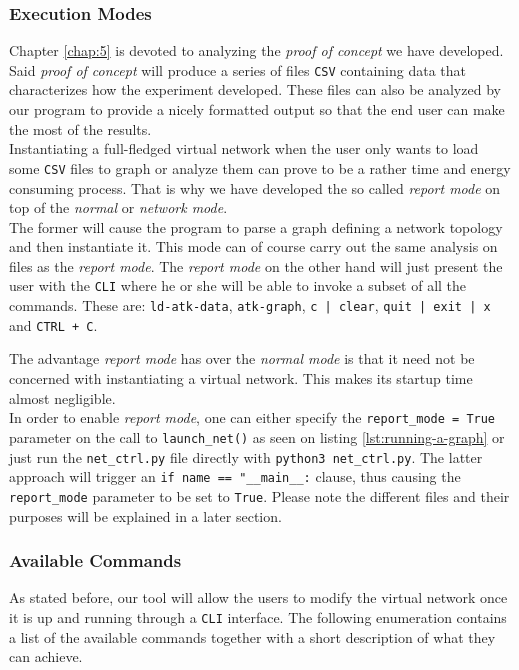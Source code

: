             \subsubsection{Execution Modes}
                Chapter \ref{chap:5} is devoted to analyzing the \textit{proof of concept} we have developed. Said \textit{proof of concept} will produce a series of files \texttt{CSV} containing data that characterizes how the experiment developed. These files can also be analyzed by our program to provide a nicely formatted output so that the end user can make the most of the results.\\

                Instantiating a full-fledged virtual network when the user only wants to load some \texttt{CSV} files to graph or analyze them can prove to be a rather time and energy consuming process. That is why we have developed the so called \textit{report mode} on top of the \textit{normal} or \textit{network mode}.\\

                The former will cause the program to parse a graph defining a network topology and then instantiate it. This mode can of course carry out the same analysis on files as the \textit{report mode}. The \textit{report mode} on the other hand will just present the user with the \texttt{CLI} where he or she will be able to invoke a subset of all the commands. These are: \texttt{ld-atk-data}, \texttt{atk-graph}, \texttt{c | clear}, \texttt{quit | exit | x} and \texttt{CTRL + C}.

                The advantage \textit{report mode} has over the \textit{normal mode} is that it need not be concerned with instantiating a virtual network. This makes its startup time almost negligible.\\

                In order to enable \textit{report mode}, one can either specify the \texttt{report\_mode = True} parameter on the call to \texttt{launch\_net()} as seen on listing \ref{lst:running-a-graph} or just run the \texttt{net\_ctrl.py} file directly with \texttt{python3 net\_ctrl.py}. The latter approach will trigger an \texttt{if name == "\_\_main\_\_:} clause, thus causing the \texttt{report\_mode} parameter to be set to \texttt{True}. Please note the different files and their purposes will be explained in a later section.\\

            \subsubsection{Available Commands} \label{sec:cli-cmds}
                As stated before, our tool will allow the users to modify the virtual network once it is up and running through a \texttt{CLI} interface. The following enumeration contains a list of the available commands together with a short description of what they can achieve.\\

